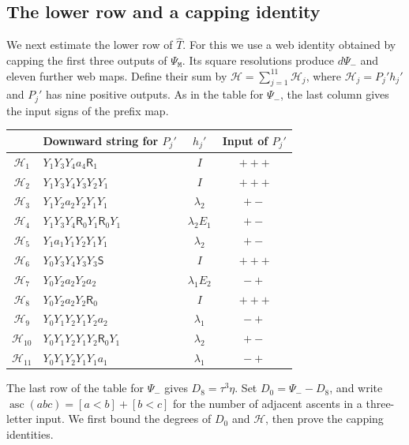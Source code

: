 \documentclass[a4paper,11pt]{amsart}
\newcommand{\wordmiddle}{\mathtt{M}}
\newcommand{\middlemap}{{\Psi}_{{\wordmiddle}}}
\newcommand{\removemap}{{\Psi}_-}
\numberwithin{equation}{subsection}
\theoremstyle{plain}
\theoremstyle{definition}
\theoremstyle{remark}
\begin{document}
\subsection{The lower row and a capping identity}\label{loc:lower}

We next estimate the lower row of $\widehat T$. For this we use a
web identity obtained by capping the first three outputs of $\middlemap$. Its square resolutions produce $d\removemap$ and eleven further
web maps. Define their sum by $\mathcal H=\sum_{j=1}^{11}\mathcal H_j$, where
$\mathcal H_j=P_j'h_j'$ and $P_j'$ has nine positive outputs. As in the table
for $\removemap$, the last column gives the input signs of the prefix map.
\begin{center}\small
\begin{tabular}{c l c c}\toprule
 &Downward string for $P_j'$&$h_j'$&Input of $P_j'$\\\midrule
$\mathcal H_1$&$Y_1Y_3Y_4a_4\mathsf R_1$&$I$&$+++$\\
$\mathcal H_2$&$Y_1Y_3Y_4Y_3Y_2Y_1$&$I$&$+++$\\
$\mathcal H_3$&$Y_1Y_2a_2Y_2Y_1Y_1$&$\lambda_2$&$+-$\\
$\mathcal H_4$&$Y_1Y_3Y_4\mathsf R_0Y_1\mathsf R_0Y_1$&$\lambda_2E_1$&$+-$\\
$\mathcal H_5$&$Y_1a_1Y_1Y_2Y_1Y_1$&$\lambda_2$&$+-$\\
$\mathcal H_6$&$Y_0Y_3Y_4Y_3Y_3\mathsf S$&$I$&$+++$\\
$\mathcal H_7$&$Y_0Y_2a_2Y_2a_2$&$\lambda_1E_2$&$-+$\\
$\mathcal H_8$&$Y_0Y_2a_2Y_2\mathsf R_0$&$I$&$+++$\\
$\mathcal H_9$&$Y_0Y_1Y_2Y_1Y_2a_2$&$\lambda_1$&$-+$\\
$\mathcal H_{10}$&$Y_0Y_1Y_2Y_1Y_2\mathsf R_0Y_1$&$\lambda_2$&$+-$\\
$\mathcal H_{11}$&$Y_0Y_1Y_2Y_1Y_1a_1$&$\lambda_1$&$-+$\\\bottomrule
\end{tabular}
\end{center}
The last row of the table for $\removemap$ gives $D_8=\tau^3\eta$.
Set $D_0=\removemap-D_8$, and write
$\operatorname{asc}(abc)=[a<b]+[b<c]$ for the number of adjacent
ascents in a three-letter input. We first bound the degrees of
$D_0$ and $\mathcal H$, then prove the capping identities.
\end{document}
